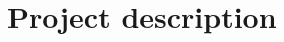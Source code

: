 \documentclass[12pt,oneside,a4paper]{article}
\begin{document}




\section{Project description}
%
\end{document}
